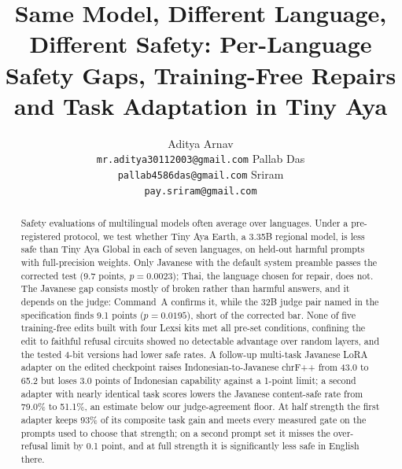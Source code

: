 \documentclass[11pt]{article}
\title{Same Model, Different Language, Different Safety: Per-Language Safety Gaps, Training-Free Repairs
and Task Adaptation in Tiny Aya}
\author{Aditya Arnav \\
  \texttt{mr.aditya30112003@gmail.com} \And
  Pallab Das \\
  \texttt{pallab4586das@gmail.com} \AND
  Sriram \\
  \texttt{pay.sriram@gmail.com}}
\begin{document}
\maketitle

\begin{abstract}
Safety evaluations of multilingual models often average over languages. Under a pre-registered protocol, we
test whether Tiny Aya Earth, a 3.35B regional model, is less safe than Tiny Aya Global in each of seven
languages, on held-out harmful prompts with full-precision weights. Only Javanese with the default system
preamble passes the corrected test (9.7 points, $p = 0.0023$); Thai, the language chosen for repair, does not.
The Javanese gap consists mostly of broken rather than harmful answers, and it depends on the judge: Command~A
confirms it, while the 32B judge pair named in the specification finds 9.1 points ($p = 0.0195$), short of the
corrected bar. None of five training-free edits built with four Lexsi kits met all pre-set conditions, confining the
edit to faithful refusal circuits showed no detectable advantage over random layers, and the tested 4-bit versions
had lower safe rates. A follow-up multi-task Javanese LoRA adapter on the edited checkpoint raises
Indonesian-to-Javanese chrF++ from 43.0 to 65.2 but loses 3.0 points of Indonesian capability against a 1-point
limit; a second adapter with nearly identical task scores lowers the Javanese content-safe rate from 79.0\% to
51.1\%, an estimate below our judge-agreement floor. At half strength the first adapter keeps 93\% of its composite
task gain and meets every measured gate on the prompts used to choose that strength; on a second prompt set it
misses the over-refusal limit by 0.1 point, and at full strength it is significantly less safe in English there.
\end{abstract}
\end{document}
